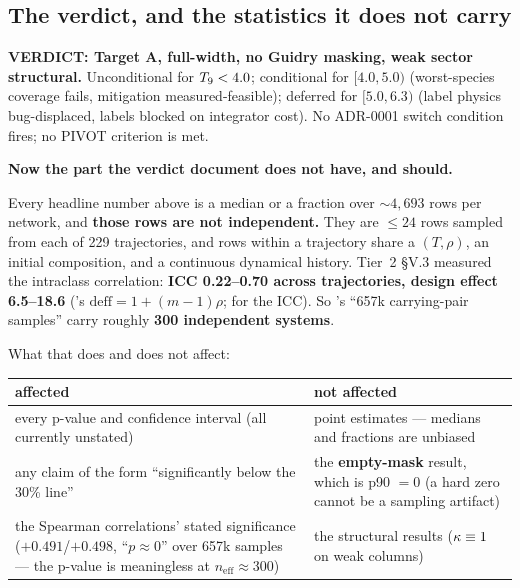 \subsection{The verdict, and the statistics it does not carry}
\label{sec:verdict}

\begin{result}
\textbf{VERDICT: Target A, full-width, no Guidry masking, weak sector
structural.} Unconditional for $T_{9} < 4.0$; conditional for $[4.0, 5.0)$
(worst-species coverage fails, mitigation measured-feasible); deferred for
$[5.0, 6.3)$ (label physics bug-displaced, \Phifl{} labels blocked on
integrator cost). No ADR-0001 switch condition fires; no PIVOT criterion is
met.
\end{result}

\textbf{Now the part the verdict document does not have, and should.}

Every headline number above is a median or a fraction over ${\sim}4{,}693$ rows
per network, and \textbf{those rows are not independent.} They are $\le 24$
rows sampled from each of 229 trajectories, and rows within a trajectory share
a $(T, \rho)$, an initial composition, and a continuous dynamical history.
Tier~2 \S V.3 measured the intraclass correlation: \textbf{ICC 0.22--0.70 across
trajectories, design effect 6.5--18.6} (\citealt{kish1965}'s
$\mathrm{deff} = 1 + (m - 1)\rho$; \citealt{shrout1979} for the ICC). So
's ``657k carrying-pair samples'' carry roughly \textbf{300
independent systems}.

What that does and does not affect:

\begingroup\small
\begin{tabularx}{\textwidth}{@{}Y Y@{}}
\toprule
\textbf{affected} & \textbf{not affected} \\
\midrule
every p-value and confidence interval (all currently unstated) &
  point estimates --- medians and fractions are unbiased \\
any claim of the form ``significantly below the 30\% line'' &
  the \textbf{empty-mask} result, which is p90 $= 0$ (a hard zero cannot be a
  sampling artifact) \\
the Spearman correlations' stated significance ($+0.491$/$+0.498$,
  ``$p \approx 0$'' over 657k samples --- the p-value is meaningless at
  $n_{\mathrm{eff}} \approx 300$) &
  the structural results ($\kappa \equiv 1$ on weak columns) \\
\bottomrule
\end{tabularx}
\endgroup

